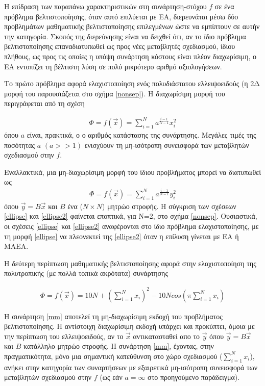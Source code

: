 Η επίδραση των παραπάνω χαρακτηριστικών στη συνάρτηση-στόχου $f$ σε ένα πρόβλημα βελτιστοποίησης, όταν αυτό επιλύεται με ΕΑ,  διερευνάται μέσω δύο προβλημάτων μαθηματικής βελτιστοποίησης επιλεγμένων ώστε να εμπίπτουν σε αυτήν την κατηγορία. Σκοπός της διερεύνησης είναι να δειχθεί ότι, αν το ίδιο πρόβλημα βελτιστοποίησης επαναδιατυπωθεί ως προς νέες μεταβλητές σχεδιασμού, ίδιου πλήθους, ως προς τις οποίες η υπόψη συνάρτηση κόστους είναι πλέον διαχωρίσιμη, ο ΕΑ εντοπίζει τη βέλτιστη λύση σε πολύ μικρότερο αριθμό αξιολογήσεων.  

Το πρώτο πρόβλημα αφορά ελαχιστοποίηση ενός πολυδιάστατου ελλειψοειδούς (η 2Δ μορφή του παρουσιάζεται στο σχήμα \ref{nonsep}). Η διαχωρίσιμη μορφή του περιγράφεται από τη σχέση   

\begin{eqnarray}
   \Phi=f(\vec{x})=\sum^{N}_{i=1}a^{\frac{i-1}{N-1}}x_i^2
   \label{ellipse} 
\end{eqnarray}
όπου $a$ είναι, πρακτικά, ο ο αριθμός κατάστασης της συνάρτησης. Μεγάλες τιμές της ποσότητας $a$ $(a>>1)$ ενισχύουν τη μη-ισότροπη συνεισφορά των μεταβλητών σχεδιασμού στην $f$.

Εναλλακτικά, μια μη-διαχωρίσιμη μορφή του ίδιου προβλήματος μπορεί να διατυπωθεί ως 
\begin{eqnarray}
   \Phi=f(\vec{x})=\sum^{N}_{i=1}a^{\frac{i-1}{N-1}}y_i^2
   \label{ellipse2} 
\end{eqnarray}
όπου $\vec{y}=B\vec{x}$ και $B$ ένα ($N\times N$) μητρώο στροφής. Η σύγκριση των σχέσεων \ref{ellipse} και \ref{ellipse2} φαίνεται εποπτικά, για Ν=2, στο σχήμα \ref{nonsep}. Ουσιαστικά, οι σχέσεις \ref{ellipse} και \ref{ellipse2} αναφέρονται στο ίδιο πρόβλημα ελαχιστοποίησης, με τη μορφή \ref{ellipse} να πλεονεκτεί της \ref{ellipse2} όταν η επίλυση γίνεται με ΕΑ ή ΜΑΕΑ.  

Η δεύτερη περίπτωση μαθηματικής βελτιστοποίησης αφορά στην ελαχιστοποίηση της πολυτροπικής (με πολλά τοπικά ακρότατα) συνάρτησης 

\begin{eqnarray}
  \Phi=f(\vec{x})=10N+(\sum^{N}_{i=1}x_i)^2 - 10Ncos(\pi  \sum^{N}_{i=1}x_i)
   \label{mm} 
\end{eqnarray}

Η συνάρτηση \ref{mm} αποτελεί τη μη-διαχωρίσιμη εκδοχή του προβλήματος βελτιστοποίησης. Η αντίστοιχη διαχωρίσιμη εκδοχή υπάρχει και προκύπτει, όμοια με την περίπτωση του ελλειψοειδούς, αν το $\vec{x}$ αντικατασταθεί απο το $\vec{y}$ όπου $\vec{y}=B\vec{x}$ και $B$ κατάλληλο μητρώο στροφής. Η συνάρτηση \ref{mm}, έχοντας, στην πραγματικότητα, μόνο μια σημαντική κατεύθυνση στο χώρο σχεδιασμού ($\sum^{N}_{i=1}x_i$), ανήκει στην κατηγορία των συναρτήσεων με εξαιρετικά μη-ισότροπη συνεισφορά των μεταβλητών σχεδιασμού στην $f$ (ως εάν $a=\infty$ στο προηγούμενο παράδειγμα). 

